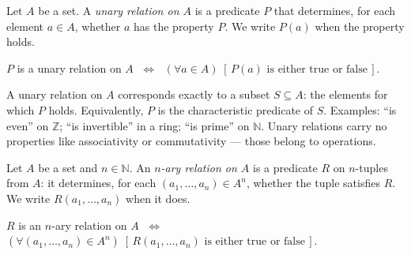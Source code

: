 \vspace{1em}


\begin{tcolorbox}[colback=propbox, colframe=propborder, arc=2pt,
  left=6pt, right=6pt, top=4pt, bottom=4pt,
  title={\small\textbf{Definition (Unary Relation on a Set)}},
  fonttitle=\small\bfseries]
\label{def:unary-relation}
Let $A$ be a set.
A \emph{unary relation on $A$} is a predicate $P$ that determines,
for each element $a \in A$, whether $a$ has the property $P$.
We write $P(a)$ when the property holds.
\end{tcolorbox}

\begin{remark}
$P$ is a unary relation on $A$
$\;\iff\;$
$(\forall a \in A)\;[\,P(a) \text{ is either true or false}\,]$.
\end{remark}

\begin{remark}
A unary relation on $A$ corresponds exactly to a subset $S \subseteq A$:
the elements for which $P$ holds.
Equivalently, $P$ is the characteristic predicate of $S$.
Examples: ``is even'' on $\mathbb{Z}$; ``is invertible'' in a ring;
``is prime'' on $\mathbb{N}$.
Unary relations carry no properties like associativity or commutativity —
those belong to operations.
\end{remark}


\begin{tcolorbox}[colback=propbox, colframe=propborder, arc=2pt,
  left=6pt, right=6pt, top=4pt, bottom=4pt,
  title={\small\textbf{Definition ($n$-ary Relation on a Set)}},
  fonttitle=\small\bfseries]
\label{def:nary-relation}
Let $A$ be a set and $n \in \mathbb{N}$.
An \emph{$n$-ary relation on $A$} is a predicate $R$ on $n$-tuples from $A$:
it determines, for each $(a_1, \ldots, a_n) \in A^n$, whether the tuple
satisfies $R$.
We write $R(a_1, \ldots, a_n)$ when it does.
\end{tcolorbox}

\begin{remark}
$R$ is an $n$-ary relation on $A$
$\;\iff\;$
$(\forall (a_1, \ldots, a_n) \in A^n)\;
[\,R(a_1, \ldots, a_n) \text{ is either true or false}\,]$.
\end{remark}

